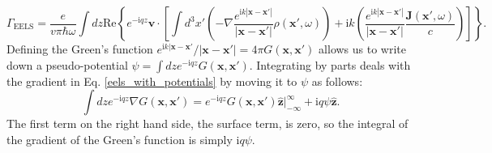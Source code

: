\documentclass [11pt, proquest] {uwthesis}[2016/11/22]
\begin{document}
\begin{equation}
\Gamma_{\textrm{EELS}} = \frac{e}{v\pi\hbar\omega}\int dz \textrm{Re}\left\{ e^{-\textrm{i}qz} \textbf{v} \cdot \left[\int d^3x' \left(-\nabla\frac{e^{\textrm{i}k|\textbf{x}-\textbf{x}'|}}{|\textbf{x}-\textbf{x}'|}\rho(\textbf{x}',\omega)\right) + \textrm{i}k\left(\frac{e^{\textrm{i}k|\textbf{x}-\textbf{x}'|}}{|\textbf{x}-\textbf{x}'|}\frac{\textbf{J}(\textbf{x}',\omega)}{c}\right)\right]\right\}.
\label{eels_with_potentials}
\end{equation}
Defining the Green's function $e^{\textrm{i}k|\textbf{x}-\textbf{x}'}/|\textbf{x}-\textbf{x}'| = 4\pi G(\textbf{x},\textbf{x}')$ allows us to write down a pseudo-potential $\psi = \int dz e^{-\textrm{i}qz} G(\textbf{x},\textbf{x}')$. Integrating by parts deals with the gradient in Eq. \ref{eels_with_potentials} by moving it to $\psi$ as follows: 
\begin{equation}
\int dz e^{-\textrm{i}qz} \nabla G(\textbf{x},\textbf{x}') = e^{-\textrm{i}qz} G(\textbf{x},\textbf{x}') \hat{\textbf{z}} \Big|_{-\infty}^{\infty} + \textrm{i}q \psi \hat{\textbf{z}}.
\label{psi_integral}
\end{equation}
The first term on the right hand side, the surface term, is zero, so the integral of the gradient of the Green's function is simply $\textrm{i}q\psi$.
\end{document}
